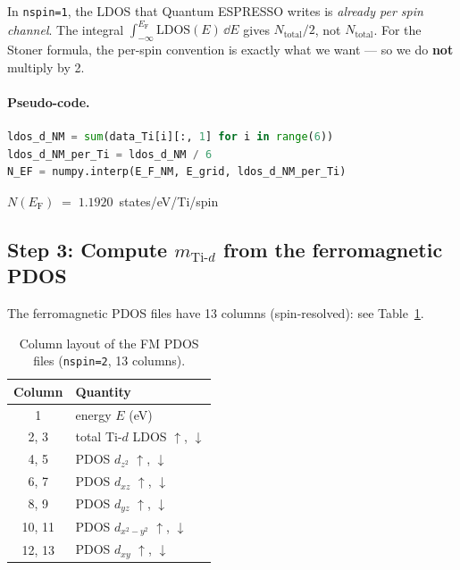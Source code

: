 \documentclass[11pt,a4paper]{article}
\newcommand{\Ef}{E_{\mathrm{F}}}
\newcommand{\Tid}{\text{Ti-}d}
\newcommand{\NEf}{N(\Ef)}
\begin{document}
\begin{warningbox}
In \texttt{nspin=1}, the LDOS that Quantum ESPRESSO writes is
\emph{already per spin channel}. The integral $\int_{-\infty}^{\Ef}
\text{LDOS}(E)\,\dd E$ gives $N_{\text{total}}/2$, not $N_{\text{total}}$.
For the Stoner formula, the per-spin convention is exactly what we want
— so we do \textbf{not} multiply by 2.
\end{warningbox}

\paragraph{Pseudo-code.}
\begin{lstlisting}[language=Python]
ldos_d_NM = sum(data_Ti[i][:, 1] for i in range(6))
ldos_d_NM_per_Ti = ldos_d_NM / 6
N_EF = numpy.interp(E_F_NM, E_grid, ldos_d_NM_per_Ti)
\end{lstlisting}

\begin{resultbox}
$\NEf \;=\; 1.1920$~states/eV/Ti/spin
\end{resultbox}

\subsection{Step 3: Compute $m_{\Tid}$ from the ferromagnetic PDOS}

The ferromagnetic PDOS files have 13 columns (spin-resolved): see
Table~\ref{tab:pdos-FM}.
%
\begin{table}[h!]
\small
\centering
\begin{tabular}{c l}
\toprule
Column & Quantity \\
\midrule
1     & energy $E$ (eV) \\
2, 3  & total Ti-$d$ LDOS $\uparrow$, $\downarrow$ \\
4, 5  & PDOS $d_{z^2}$ $\uparrow$, $\downarrow$ \\
6, 7  & PDOS $d_{xz}$  $\uparrow$, $\downarrow$ \\
8, 9  & PDOS $d_{yz}$  $\uparrow$, $\downarrow$ \\
10, 11& PDOS $d_{x^2-y^2}$ $\uparrow$, $\downarrow$ \\
12, 13& PDOS $d_{xy}$ $\uparrow$, $\downarrow$ \\
\bottomrule
\end{tabular}
\caption{Column layout of the FM PDOS files (\texttt{nspin=2}, 13
columns).}
\label{tab:pdos-FM}
\end{table}
\end{document}
